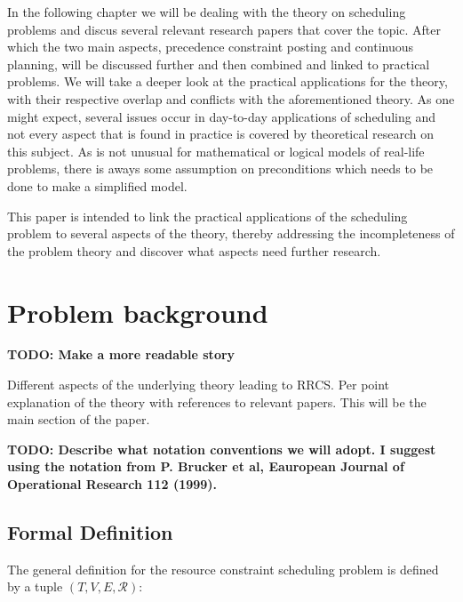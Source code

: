\documentclass{article}
\newcommand{\TODO}[1]{{\color{red}\textbf{TODO: #1}}}
\begin{document}
In the following chapter we will be dealing with the theory on scheduling problems and discus several relevant research papers that cover the topic.
After which the two main aspects, precedence constraint posting and continuous planning, will be discussed further and then combined and linked to practical problems.
We will take a deeper look at the practical applications for the theory, with their respective overlap and conflicts with the aforementioned theory.
As one might expect, several issues occur in day-to-day applications of scheduling and not every aspect that is found in practice is covered by theoretical research on this subject.
As is not unusual for mathematical or logical models of real-life problems, there is aways some assumption on preconditions which needs to be done to make a simplified model.

This paper is intended to link the practical applications of the scheduling problem to several aspects of the theory, thereby addressing the incompleteness of the problem theory and discover what aspects need further research.

\newpage

\section{Problem background}

\TODO{Make a more readable story}

Different aspects of the underlying theory leading to RRCS.  Per point explanation of the theory with references to relevant papers. This will be the main section of the paper.

\TODO{Describe what notation conventions we will adopt. I suggest using the notation from P. Brucker et al, Eauropean Journal of Operational Research 112 (1999). }

\subsection{Formal Definition}
The general definition for the resource constraint scheduling problem is defined by a tuple $(T, V, E, \mathcal{R})$: \cite{brucker99}
\end{document}
